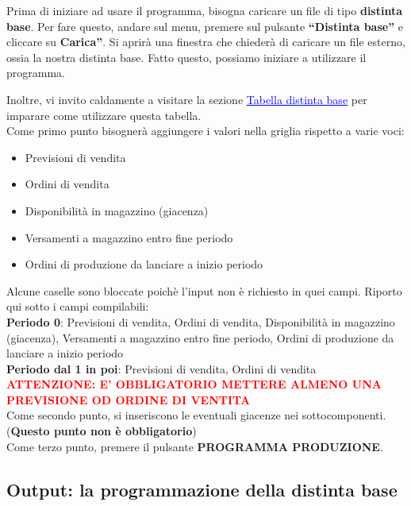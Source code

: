 \documentclass[12pt,twoside]{report}
\newcommand{\coloredbold}[2]{\textcolor{#1}{\textbf{#2}}}
\begin{document}
Prima di iniziare ad usare il programma, bisogna caricare un file di tipo \textbf{distinta base}. Per fare questo, andare sul menu, premere sul pulsante \textbf{“Distinta base”} e cliccare su \textbf{Carica”}. Si aprirà una finestra che chiederà di caricare un file esterno, ossia la nostra distinta base. Fatto questo, possiamo iniziare a utilizzare il programma.

Inoltre, vi invito caldamente a visitare la sezione \hyperlink{tabDistintaBase}{\textcolor{blue}{\underline{Tabella distinta base}}} per imparare come utilizzare questa tabella.\\

Come primo punto bisognerà aggiungere i valori nella griglia rispetto a varie voci:
\begin{itemize}
	
	\item Previsioni di vendita
	\item Ordini di vendita
	\item Disponibilità in magazzino (giacenza)
	\item Versamenti a magazzino entro fine periodo
	\item Ordini di produzione da lanciare a inizio periodo
	      	
\end{itemize}

Alcune caselle sono bloccate poichè l'input non è richiesto in quei campi.
Riporto qui sotto i campi compilabili:\\

\textbf{Periodo 0}: 
Previsioni di vendita,
Ordini di vendita,
Disponibilità in magazzino (giacenza),
Versamenti a magazzino entro fine periodo,
Ordini di produzione da lanciare a inizio periodo\\

\textbf{Periodo dal 1 in poi}:
Previsioni di vendita,
Ordini di vendita\\

\coloredbold{red}{ATTENZIONE: E' OBBLIGATORIO METTERE ALMENO UNA PREVISIONE OD ORDINE DI VENTITA}\\

Come secondo punto, si inseriscono le eventuali giacenze nei sottocomponenti. (\textbf{Questo punto non è obbligatorio})\\

Come terzo punto, premere il pulsante \textbf{PROGRAMMA PRODUZIONE}.

\subsection{Output: la programmazione della distinta base}
\end{document}
